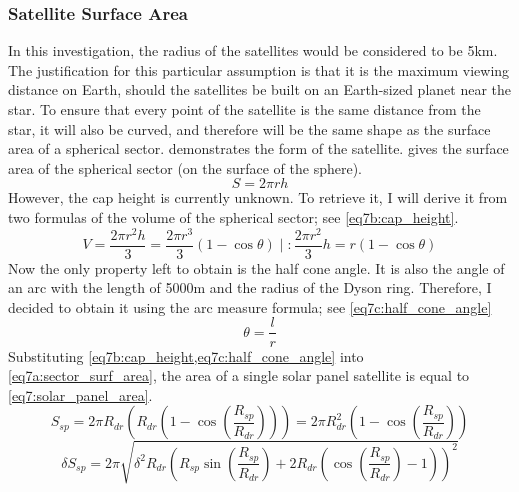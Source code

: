 \documentclass[stu, 11pt, a4paper, floatsintext, noextraspace]{apa7}
\begin{document}
	\subsubsection{Satellite Surface Area}
	In this investigation, the radius of the satellites would be considered to be 5km. The justification for this particular assumption is that it is the maximum viewing distance on Earth, should the satellites be built on an Earth-sized planet near the star. To ensure that every point of the satellite is the same distance from the star, it will also be curved, and therefore will be the same shape as the surface area of a spherical sector.  demonstrates the form of the satellite.
	 gives the surface area of the spherical sector (on the surface of the sphere).
	\begin{equation}
		\label{eq7a:sector_surf_area}
		\tag{7.a}
		 S=2\pi rh
	\end{equation}
	However, the cap height is currently unknown. To retrieve it, I will derive it from two formulas of the volume of the spherical sector; see \cref{eq7b:cap_height}.
	\begin{equation}
		\label{eq7b:cap_height}
		\tag{7.b}
		V=\frac{2\pi r^2h}{3}=\frac{2\pi r^3}{3}\left(1-\cos\theta\right)\;|\;:\frac{2\pi r^2}{3}
		h = r\left(1-\cos\theta\right)
	\end{equation}
	Now the only property left to obtain is the half cone angle. It is also the angle of an arc with the length of 5000m and the radius of the Dyson ring. Therefore, I decided to obtain it using the arc measure formula; see \cref{eq7c:half_cone_angle}
	\begin{equation}
		\label{eq7c:half_cone_angle}
		\tag{7.c}
		\theta = \frac{l}{r}
	\end{equation}
	Substituting \cref{eq7b:cap_height,eq7c:half_cone_angle} into \cref{eq7a:sector_surf_area}, the area of a single solar panel satellite is equal to \cref{eq7:solar_panel_area}.
	\begin{equation}
		\label{eq7:solar_panel_area}
		S_{sp}=2\pi R_{dr} \left(R_{dr}\left(1-\cos\left(\frac{R_{sp}}{R_{dr}}\right)\right)\right)=2\pi R_{dr}^2\left(1-\cos\left(\frac{R_{sp}}{R_{dr}}\right)\right)
	\end{equation}
	\begin{equation*}
		\delta S_{sp}=2\pi\sqrt{\delta^2R_{dr}\left(R_{sp}\sin\left(\frac{R_{sp}}{R_{dr}}\right)+2R_{dr}\left(\cos\left(\frac{R_{sp}}{R_{dr}}\right)-1\right)\right)^2}
	\end{equation*}
\end{document}
